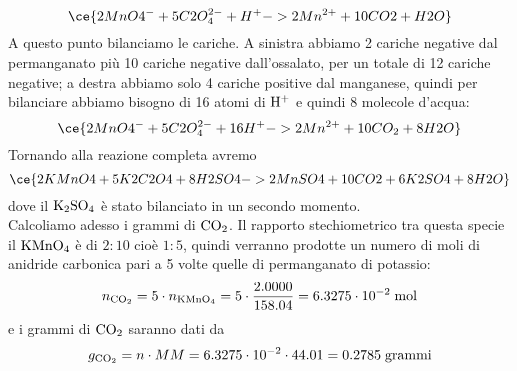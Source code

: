\begin{soluzione}
\begin{equation*}
        \ce{2MnO4^- + 5C2O_4^{2-} + H^+ -> 2Mn^{2+} + 10CO2 + H2O}
    \end{equation*}
    A questo punto bilanciamo le cariche. A sinistra abbiamo 2 cariche negative dal permanganato più 10 cariche negative dall'ossalato, per un totale di 12 cariche negative; a destra abbiamo solo 4 cariche positive dal manganese, quindi per bilanciare abbiamo bisogno di 16 atomi di $\rm H^+$ e quindi 8 molecole d'acqua:
    \begin{equation*}
        \ce{2MnO4^- + 5C2O_4^{2-} + 16H^+ -> 2Mn^{2+} + 10CO_2 + 8H2O}
    \end{equation*}
    Tornando alla reazione completa avremo
    \begin{equation*}
        \ce{2KMnO4 + 5K2C2O4 + 8H2SO4 -> 2MnSO4 + 10CO2 + 6K2SO4 + 8H2O}
    \end{equation*}
    dove il $\rm K_2SO_4$ è stato bilanciato in un secondo momento.\\
    Calcoliamo adesso i grammi di $\rm CO_2$. Il rapporto stechiometrico tra questa specie il $\rm KMnO_4$ è di $2:10$ cioè $1:5$, quindi verranno prodotte un numero di moli di anidride carbonica pari a 5 volte quelle di permanganato di potassio:
    \begin{equation*}
        n_{\rm CO_2}
        =5 \cdot n_{\rm KMnO_4}
        =5 \cdot \frac{2.0000}{158.04}
        =6.3275 \cdot 10^{-2} \; \rm mol
    \end{equation*}
    e i grammi di $\rm CO_2$ saranno dati da
    \begin{equation*}
        g_{\rm CO_2}
        =n \cdot MM=6.3275 \cdot 10^{-2} \cdot 44.01
        =0.2785 \; \rm grammi
    \end{equation*}
\end{soluzione}

\newpage

